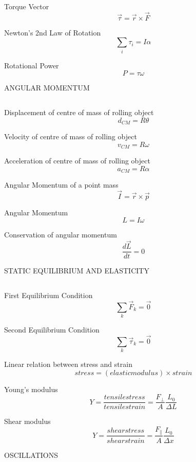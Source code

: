 \documentclass[12pt, letterpaper, twoside]{article}
\begin{document}
Torque Vector
$$ \overrightarrow{\tau} = \overrightarrow{r} \times \overrightarrow{F}$$



Newton's 2nd Law of Rotation
$$ \sum_i \tau_i = I \alpha $$



Rotational Power
$$ P = \tau \omega $$











\newpage



ANGULAR MOMENTUM

$$ $$



Displacement of centre of mass of rolling object
$$ d_{CM} = R \theta $$


Velocity of centre of mass of rolling object
$$ v_{CM} = R \omega $$


Acceleration of centre of mass of rolling object
$$ a_{CM} = R \alpha $$


Angular Momentum of a point mass
$$ \overrightarrow{I} = \overrightarrow{r} \times \overrightarrow{p} $$


Angular Momentum
$$  L = I \omega $$


Conservation of angular momentum
$$  \frac{d \overrightarrow{L}}{dt} = 0  $$





\newpage


STATIC EQUILIBRIUM AND ELASTICITY

$$ $$


First Equilibrium Condition
$$ \sum_k \overrightarrow{F}_k = \overrightarrow{0} $$


Second Equilibrium Condition
$$ \sum_k \overrightarrow{\tau}_k = \overrightarrow{0} $$


Linear relation between stress and strain
$$ stress = (elastic modulus) \times strain $$


Young's modulus
$$  Y = \frac{tensile stress}{tensile strain} = \frac{F_\bot}{A} \frac{L_0}{\Delta L} $$


Shear modulus
$$  Y = \frac{shear stress}{shear strain} = \frac{F_\parallel}{A} \frac{L_0}{\Delta x} $$





\newpage

OSCILLATIONS
$$ $$
\end{document}
